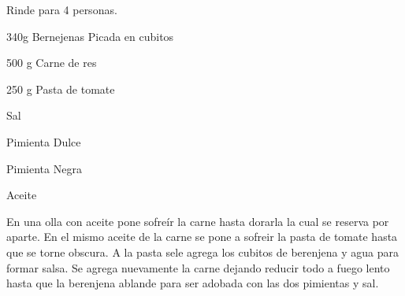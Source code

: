 
Rinde para 4 personas.


\begin{ingredientes}
\item 340g Bernejenas Picada en cubitos
\item 500 g Carne de res
\item 250 g Pasta de tomate
\item Sal
\item Pimienta Dulce
\item Pimienta Negra
\item Aceite
\end{ingredientes}
\preparacion

En una olla con aceite pone sofreír la carne hasta dorarla la cual se reserva por aparte. En el mismo aceite de la carne se pone a sofreir la pasta de tomate hasta que se torne obscura. A la pasta sele agrega los cubitos de berenjena y agua para formar salsa. Se agrega nuevamente la carne dejando reducir todo a fuego lento hasta que la berenjena ablande para ser adobada con las dos pimientas y sal.
